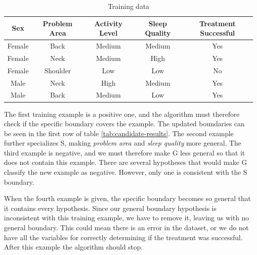 \documentclass[a4paper]{article}
\begin{document}
\begin{enumerate}
        \begin{table}[ht]
            \begin{center}
                \begin{tabular}{|c|c|c|c|c|}
                \hline
                \textbf{Sex} & \textbf{Problem Area} & \textbf{Activity Level} & \textbf{Sleep Quality} & \textbf{Treatment Successful}\\\hline
                Female & Back     & Medium & Medium & Yes\\\hline
                Female & Neck     & Medium & High   & Yes\\\hline
                Female & Shoulder & Low    & Low    & No\\\hline
                Male   & Neck     & High   & Medium & Yes\\\hline
                Male   & Back     & Medium & Low    & Yes\\\hline
                \end{tabular}
                \caption{Training data}
            \end{center}
        \end{table}

        The first training example is a positive one, and the algorithm must
        therefore check if the specific boundary covers the example. The
        updated boundaries can be seen in the first row of table
        \ref{tab:candidate-results}.  The second example further specializes S,
        making \textit{problem area} and \textit{sleep quality} more general.
        The third example is negative, and we must therefore make G less
        general so that it does not contain this example.  There are several
        hypotheses that would make G classify the new example as negative.
        However, only one is consistent with the S boundary. 

        When the fourth example is given, the specific boundary becomes so
        general that it contains every hypothesis. Since our general boundary
        hypothesis is inconsistent with this training example, we have to
        remove it, leaving us with no general boundary. This could mean there
        is an error in the dataset, or we do not have all the variables for
        correctly determining if the treatment was successful. After this
        example the algorithm should stop. 


\end{enumerate}
\end{document}
